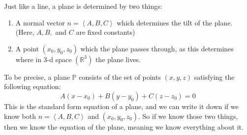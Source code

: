 \documentclass[10pt]{article}
\theoremstyle{definition}
\newcommand{\R}{\mathbb{R}}           %
\renewcommand{\P}{\mathbb{P}}         %
\begin{document}
Just like a line, a plane is determined by two things:
\begin{enumerate}
  \item A normal vector $n= \left\langle A,B,C \right\rangle$ which
  determines the tilt of the plane. (Here, $A,B,$ and $C$ are fixed constants)
  \item A point $(x_{0},y_{0},z_{0})$ which the plane passes through, as this
  determines where in 3-d space $(\R^{3})$ the plane lives.
\end{enumerate}
To be precise, a plane $\P$ consists of the set of points $(x,y,z)$ satisfying
the following equation:
\begin{equation}\label{eq:definition-normal-form-eq-of-plane}
  A(x-x_{0}) + B(y-y_{0})+C(z-z_{0})=0
\end{equation}
This is the standard form equation of a plane, and we can write it down if we
know both $n=\left\langle A,B,C \right\rangle $ and $(x_{0},y_{0},z_{0})$. So
if we know those two things, then we know the equation of the plane, meaning
we know everything about it.
\end{document}
